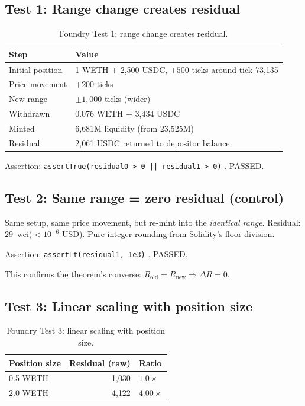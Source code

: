 \documentclass[11pt,a4paper]{article}
\begin{document}
\subsection{Test 1: Range change creates residual}\label{sec:foundry-mock-residual}

\begin{table}[H]
\centering
\caption{Foundry Test 1: range change creates residual.}\label{tab:foundry-test1}
\begin{tabular}{@{}ll@{}}
\toprule
Step & Value \\
\midrule
Initial position & 1 WETH $+$ 2{,}500 USDC, $\pm 500$ ticks around tick 73{,}135 \\
Price movement   & $+200$ ticks \\
New range        & $\pm 1{,}000$ ticks (wider) \\
Withdrawn        & 0.076 WETH $+$ 3{,}434 USDC \\
Minted           & 6{,}681M liquidity (from 23{,}525M) \\
Residual & 2{,}061 USDC returned to depositor balance \\
\bottomrule
\end{tabular}
\end{table}

Assertion: \texttt{assertTrue(residual0 > 0 || residual1 > 0)} . PASSED.

\subsection{Test 2: Same range = zero residual (control)}\label{sec:foundry-mock-control}

Same setup, same price movement, but re-mint into the \emph{identical range}. Residual: 29~wei\linebreak ($<\!10^{-6}$ USD). Pure integer rounding from Solidity's floor division.

Assertion: \texttt{assertLt(residual1, 1e3)} . PASSED.

\noindent This confirms the theorem's converse: $R_{\text{old}} = R_{\text{new}} \Rightarrow \Delta R = 0$.

\subsection{Test 3: Linear scaling with position size}\label{sec:foundry-mock-scaling}

\begin{table}[H]
\centering
\caption{Foundry Test 3: linear scaling with position size.}\label{tab:foundry-scaling}
\begin{tabular}{@{}lrl@{}}
\toprule
Position size & Residual (raw) & Ratio \\
\midrule
0.5 WETH & 1{,}030 & $1.0\times$ \\
2.0 WETH & 4{,}122 & $4.00\times$ \\
\bottomrule
\end{tabular}
\end{table}
\end{document}
